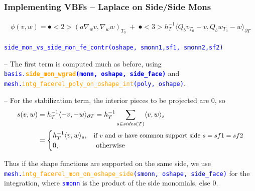\documentclass[compress]{beamer}
\begin{document}
\begin{frame}
  \frametitle{Implementing VBFs -- Laplace on Side/Side Mons}
  \vspace{-0.5cm}
  \begin{align*}
    \mathfrak \phi(v,w) = \spot<2>{(a \nabla_w v,\nabla_w w)_{\scriptscriptstyle T_0}} \;+\;
    \spot<3>{h_T^{-1}\langle Q_b v_{\scriptscriptstyle T_0} - v,Q_b w_{\scriptscriptstyle T_0} - w \rangle_{\partial T}}
  \end{align*}
  
  \texttt{\small \textcolor{blue}{side\_mon\_vs\_side\_mon\_fe\_contr(oshape, smonn1,sf1, smonn2,sf2)}}\\
  \vspace{.3cm}
  
  \pause
  \uncover<+-> {
  -- The first term is computed much as before, using  
     {\small \texttt{\textcolor{blue}{basis.\textbf{\textcolor{orange}{side\_mon\_wgrad}(monn, oshape, side\_face)}}}} and \\
     \texttt{\small \textcolor{blue}{mesh.\textcolor{orange}{intg\_facerel\_poly\_on\_oshape\_int}(poly, oshape)}}.\\
  
  \vspace{.1cm}
  \uncover<+-> {
  -- For the stabilization term, the interior pieces to be projected are 0, so 
  \begin{align*}
    s(v,w) &= h_T^{-1} \langle -v, -w \rangle_{\partial T} = h_T^{-1} \sum_{s \in sides(T)} \langle v, w \rangle_s\\
           &= 
        \begin{cases}
          h_T^{-1} \langle v, w \rangle_s, &\mbox{\small if $v$ and $w$ have common support side $s=sf1=sf2$}\\
          0, &\mbox{ otherwise}
        \end{cases}
  \end{align*}
  
  \vspace{.1cm}
  \uncover<+-> {
    Thus if the shape functions are supported on the same side, we use
    \texttt{\scriptsize \textcolor{blue}{mesh.\textcolor{orange}{intg\_facerel\_mon\_on\_oshape\_side}(smonn, oshape, side\_face)}}
    for the integration, where \texttt{\small \textcolor{blue}{smonn}} is the product of the side monomials, else $0$.
  }}}
\end{frame}
\end{document}
